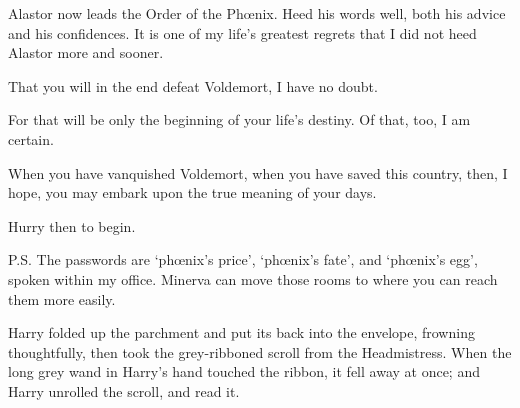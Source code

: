 \begin{writtenNote}
Alastor now leads the Order of the Phœnix. Heed his words well, both his advice and his confidences. It is one of my life's greatest regrets that I did not heed Alastor more and sooner.

That you will in the end defeat Voldemort, I have no doubt.

For that will be only the beginning of your life's destiny. Of that, too, I am certain.

When you have vanquished Voldemort, when you have saved this country, then, I hope, you may embark upon the true meaning of your days.

Hurry then to begin.


P.S. The passwords are `phœnix's price', `phœnix's fate', and `phœnix's egg', spoken within my office. Minerva can move those rooms to where you can reach them more easily.
\end{writtenNote}

\later

Harry folded up the parchment and put its back into the envelope, frowning thoughtfully, then took the grey-ribboned scroll from the Headmistress. When the long grey wand in Harry's hand touched the ribbon, it fell away at once; and Harry unrolled the scroll, and read it.

\later

